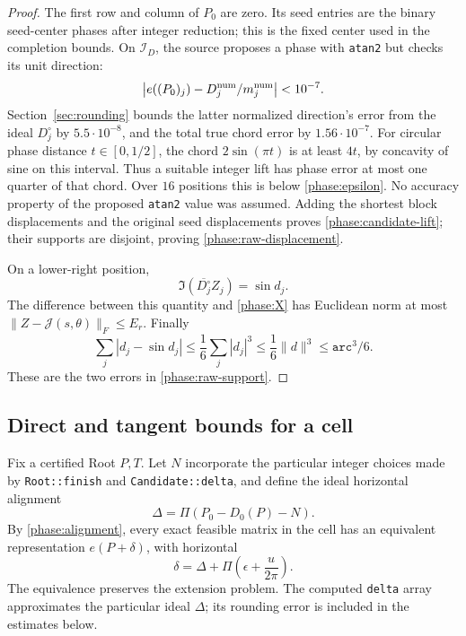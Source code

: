 \begin{proof}
The first row and column of \(P_0\) are zero.  Its seed entries are the
binary seed-center phases after
integer reduction; this is the fixed center used in the completion
bounds.  On \(\mathcal I_D\), the source proposes a phase with
\texttt{atan2} but checks its unit direction:
\[
 \bigl|e((P_0)_j)-D^{\rm num}_j/m^{\rm num}_j\bigr|<10^{-7}.
\]
Section~\ref{sec:rounding} bounds the latter normalized direction's
error from the ideal \(D_j^\circ\) by \(5.5\cdot10^{-8}\), and the
total true chord error by \(1.56\cdot10^{-7}\).
For circular phase distance \(t\in[0,1/2]\), the chord
\(2\sin(\pi t)\) is at least \(4t\), by concavity of sine on this
interval.  Thus a suitable integer lift has phase error at most one
quarter of that chord.  Over \(16\) positions this is below
\eqref{phase:epsilon}.  No accuracy property of the proposed
\texttt{atan2} value was assumed.  Adding the shortest block
displacements and the original seed displacements proves
\eqref{phase:candidate-lift}; their supports are disjoint, proving
\eqref{phase:raw-displacement}.

On a lower-right position,
\[
 \Im(\overline{D_j^\circ}Z_j)=\sin d_j.
\]
The difference between this quantity and
\eqref{phase:X} has Euclidean norm at most
\(\|Z-\mathcal J(s,\theta)\|_F\leq E_r\).
Finally
\[
 \sum_j|d_j-\sin d_j|
 \leq\frac16\sum_j|d_j|^3
 \leq\frac16\|d\|^3
 \leq\mathtt{arc}^3/6.
\]
These are the two errors in \eqref{phase:raw-support}.
\end{proof}

\subsection{Direct and tangent bounds for a cell}

Fix a certified Root \(P,T\).  Let \(N\) incorporate the particular
integer choices made by \texttt{Root::finish} and
\texttt{Candidate::delta}, and define the ideal horizontal alignment
\begin{equation}
 \Delta=\Pi(P_0-D_0(P)-N).
 \label{phase:Delta}
\end{equation}
By \eqref{phase:alignment}, every exact feasible matrix in the cell
has an equivalent representation \(e(P+\delta)\), with horizontal
\begin{equation}
 \delta=\Delta+\Pi\left(\epsilon+\frac{u}{2\pi}\right).
 \label{phase:delta}
\end{equation}
The equivalence preserves the extension problem.  The computed
\texttt{delta} array approximates the particular ideal \(\Delta\);
its rounding error is included in the estimates below.

